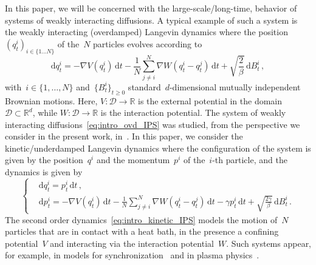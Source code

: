 \documentclass[onefignum,onetabnum]{siamart251216} %
\renewcommand{\d}{\mathrm{d}}
\newcommand{\real}{\mathbb R}
\renewcommand{\geq}{\geqslant}
\newcommand{\vqt}[1]{q_t^{#1}}
\newcommand{\vpt}[1]{p_t^{#1}}
\theoremstyle{plain}
\numberwithin{equation}{section}
\numberwithin{theorem}{section}
\begin{document}
In this paper, we will be concerned with the large-scale/long-time, behavior of systems of weakly interacting diffusions. A typical example of such a system is the weakly interacting (overdamped) Langevin dynamics where the position~$(q^i_t)_{i\in\{1\dots N\}}$ of the~$N$ particles evolves according to
\begin{equation}
    \label{eq:intro_ovd_IPS}
    \d \vqt{i} = -\nabla V(\vqt{i})\,\d t -\frac1N \sum_{j\neq i}^{N}\nabla W(\vqt{i} -\vqt{j}) \,\d t + \sqrt{\frac{2}{\beta}}\,\d B_t^i \, ,
\end{equation}
with~$i \in \{1,\dots,N\}$ and~$ \{ B^i_t \}_{t\geq0}$ standard~$d$-dimensional mutually independent Brownian motions.
Here, $V \colon \mathcal D \to \real$ is the external potential in the domain~$\mathcal D\subset\real^d$, while $W \colon \mathcal D \to \real$ is the interaction potential. The system of weakly interacting diffusions~\eqref{eq:intro_ovd_IPS} was studied, from the perspective we consider in the present work, in~\cite{delgadino2021diffusive}. In this paper, we consider the kinetic/underdamped Langevin dynamics where the configuration of the system is given by the position~$q^i$ and the momentum~$p^i$ of the~$i$-th particle, and the dynamics is given by
\begin{equation}
    \label{eq:intro_kinetic_IPS}
    \left\{\begin{aligned}
    &\d \vqt{i} =  \vpt{i}\, \d t \, , \\
    &\d \vpt{i} = -\nabla V(\vqt{i})\,\d t -\frac1N \sum_{j\neq i}^{N}\nabla W(\vqt{i} -\vqt{j}) \,\d t - \gamma \vpt{i} \,\d t + \sqrt{\frac{2 \gamma}{\beta}}\,\d B_t^i \, .
    \end{aligned}\right.
\end{equation}
The second order dynamics~\eqref{eq:intro_kinetic_IPS} models the motion of~$N$ particles that are in contact with a heat bath, in the presence a confining potential~$V$ and interacting via the interaction potential~$W$. Such systems appear, for example, in models for synchronization~\cite{Ruffo_al_2018} and in plasma physics~\cite{dressler1987stationary}.
\end{document}
